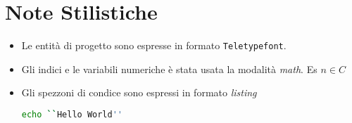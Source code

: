\section*{Note Stilistiche}
\begin{itemize}
  \item Le entità di progetto sono espresse in formato \texttt{Teletypefont}.
  \item Gli indici e le variabili numeriche è stata usata la modalità \textit{math}. Es $n \in C$
  \item Gli spezzoni di condice sono espressi in formato \textit{listing}
  \begin{lstlisting}[language=bash]
echo ``Hello World''
  \end{lstlisting}
\end{itemize}